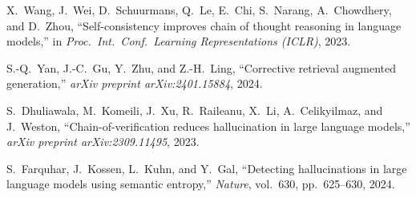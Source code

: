 %

X.\ Wang, J.\ Wei, D.\ Schuurmans, Q.\ Le, E.\ Chi, S.\ Narang, A.\ Chowdhery,
and D.\ Zhou, ``Self-consistency improves chain of thought reasoning in
language models,'' in \textit{Proc.\ Int.\ Conf.\ Learning Representations
(ICLR)}, 2023.

S.-Q.\ Yan, J.-C.\ Gu, Y.\ Zhu, and Z.-H.\ Ling, ``Corrective retrieval
augmented generation,'' \textit{arXiv preprint arXiv:2401.15884}, 2024.

S.\ Dhuliawala, M.\ Komeili, J.\ Xu, R.\ Raileanu, X.\ Li, A.\ Celikyilmaz,
and J.\ Weston, ``Chain-of-verification reduces hallucination in large
language models,'' \textit{arXiv preprint arXiv:2309.11495}, 2023.

S.\ Farquhar, J.\ Kossen, L.\ Kuhn, and Y.\ Gal, ``Detecting hallucinations in
large language models using semantic entropy,'' \textit{Nature}, vol.\ 630,
pp.\ 625--630, 2024.
